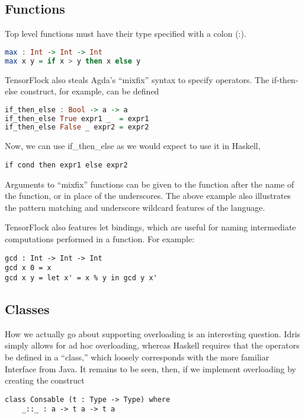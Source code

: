\documentclass[12pt]{article}
\begin{document}
\subsection{Functions}
Top level functions must have their type specified with a colon (:).
\begin{lstlisting}[language=Haskell]
max : Int -> Int -> Int
max x y = if x > y then x else y
\end{lstlisting}
TensorFlock also steals Agda's ``mixfix'' syntax to specify operators. The if-then-else construct, for example, can be defined
\begin{lstlisting}[language=Haskell]
if_then_else : Bool -> a -> a
if_then_else True expr1 _  = expr1
if_then_else False _ expr2 = expr2
\end{lstlisting}
Now, we can use if\_then\_else as we would expect to use it in Haskell, 
\begin{lstlisting}
if cond then expr1 else expr2
\end{lstlisting}
Arguments to ``mixfix'' functions can be given to the function after the name of the function, or in place of the underscores. The above example also illustrates the pattern matching and underscore wildcard features of the language. 

TensorFlock also features let bindings, which are useful for naming intermediate computations performed in a function. For example:
\begin{lstlisting}
gcd : Int -> Int -> Int
gcd x 0 = x
gcd x y = let x' = x % y in gcd y x'
\end{lstlisting}
\subsection{Classes}
How we actually go about supporting overloading is an interesting question. Idris simply allows for ad hoc overloading, whereas Haskell requires that the operators be defined in a ``class,'' which loosely corresponds with the more familiar Interface from Java. It remains to be seen, then, if we implement overloading by creating the construct 
\begin{lstlisting}
class Consable (t : Type -> Type) where
	_::_ : a -> t a -> t a
\end{lstlisting}
\end{document}
